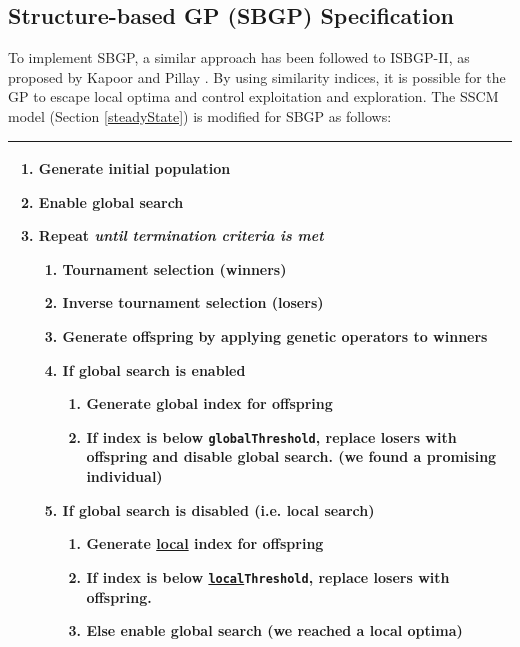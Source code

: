 \documentclass{article}
\begin{document}
\subsection{Structure-based GP (SBGP) Specification}
To implement SBGP, a similar approach has been followed to ISBGP-II, as proposed by Kapoor and Pillay \cite{kapoor_genetic_2024}. By using similarity indices, it is possible for the GP to escape local optima and control exploitation and exploration. The SSCM model (Section \ref{steadyState}) is modified for SBGP as follows:
\begin{table}[h!]
\centering
\begin{tabularx}{\textwidth}{X}
\hline
\begin{enumerate}[label=\arabic*.]
  \item Generate initial population
  \item \textbf{Enable global search}
  \item Repeat \emph{until termination criteria is met}
  \begin{enumerate}[label*=\arabic*.]
    \item Tournament selection (winners)
    \item Inverse tournament selection (losers)
    \item Generate offspring by applying genetic operators to winners
    \item \textbf{If global search is enabled}
    \begin{enumerate}[label*=\arabic*.]
      \item \textbf{Generate global index for offspring}
      \item \textbf{If index is below \texttt{globalThreshold}, replace losers with offspring and disable global search.} (we found a promising individual)
    \end{enumerate}
    \item \textbf{If global search is disabled} (i.e. local search)
    \begin{enumerate}[label*=\arabic*.]
      \item \textbf{Generate \underline{local} index for offspring}
      \item \textbf{If index is below \texttt{\underline{local}Threshold}, replace losers with offspring.} 
      \item \textbf{Else enable global search} (we reached a local optima)
    \end{enumerate}
  \end{enumerate}
\end{enumerate} \\
\hline
\end{tabularx}
\end{table}
\end{document}
